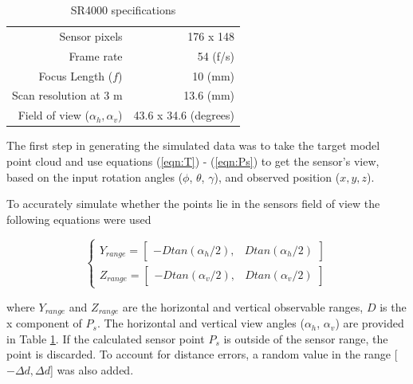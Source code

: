 \documentclass[conference]{IEEEtran}
\begin{document}
		\begin{table}[htbp]
			\caption{SR4000 specifications} %
			\centering
		\begin{tabular}{rr} %
			\hline\hline %
			Sensor pixels & 176 x 148 \\ %
			Frame rate & 54 (f/s)\\
			Focus Length ($f$) & 10 (mm) \\
			Scan resolution at 3 m & 13.6 (mm)\\
			Field of view ($\alpha_h,\alpha_v$) & 43.6 x 34.6 (degrees) \\[1ex] %
			\hline %
		\end{tabular}
		\label{tab:sr4000_spec}
		\end{table}

		The first step in generating the simulated data was to take the target model point cloud and use equations (\ref{eqn:T}) - (\ref{eqn:Ps}) to get the sensor's view, based on the input rotation angles ($\phi$, $\theta$, $\gamma$), and observed position ($x,y,z$).

		To accurately simulate whether the points lie in the sensors field of view the following equations were used

		\begin{equation}
			\label{eqn:field_view_eqs}
			\begin{cases}
				Y_{range} = \begin{bmatrix} -Dtan(\alpha_h/2), & Dtan(\alpha_h/2) \end{bmatrix} \\
				Z_{range} = \begin{bmatrix} -Dtan(\alpha_v/2), & Dtan(\alpha_v/2) \end{bmatrix}
			\end{cases}
		\end{equation}

		\noindent where $Y_{range}$ and $Z_{range}$ are the horizontal and vertical observable ranges, $D$ is the x component of $P_s$. The horizontal and vertical view angles ($\alpha_h$, $\alpha_v$) are provided in Table \ref{tab:sr4000_spec}. If the calculated sensor point $P_s$ is outside of the sensor range, the point is discarded. To account for distance errors, a random value in the range [$-\Delta d, \Delta d$] was also added.


\end{document}
